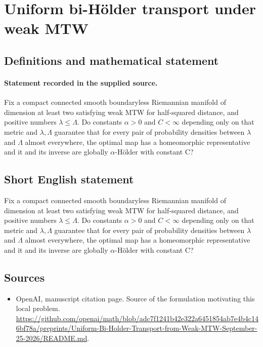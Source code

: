 \documentclass[11pt]{article}
\begin{document}
\section*{Uniform bi-Hölder transport under weak MTW}\label{30007138}
\subsection{Definitions and mathematical statement}
\paragraph{Statement recorded in the supplied source.}
Fix a compact connected smooth boundaryless Riemannian manifold of dimension at least two satisfying weak MTW for half-squared distance, and positive numbers $\lambda \leq \Lambda $. Do constants $\alpha >0$ and $C<\infty $ depending only on that metric and $\lambda ,\Lambda $ guarantee that for every pair of probability densities between $\lambda $ and $\Lambda $ almost everywhere, the optimal map has a homeomorphic representative and it and its inverse are globally $\alpha$-Hölder with constant C?
\subsection{Short English statement}
Fix a compact connected smooth boundaryless Riemannian manifold of dimension at least two satisfying weak MTW for half-squared distance, and positive numbers $\lambda \leq \Lambda $. Do constants $\alpha >0$ and $C<\infty $ depending only on that metric and $\lambda ,\Lambda $ guarantee that for every pair of probability densities between $\lambda $ and $\Lambda $ almost everywhere, the optimal map has a homeomorphic representative and it and its inverse are globally $\alpha$-Hölder with constant C?
\subsection{Sources}
\begin{itemize}
\item[S1] OpenAI, manuscript citation page. Source of the formulation motivating this local problem.
\url{https://github.com/openai/math/blob/adc7f1241b42e322a6451854ab7e4b4c146bf78a/preprints/Uniform-Bi-Holder-Transport-from-Weak-MTW-September-25-2026/README.md}.
\end{itemize}
\end{document}
